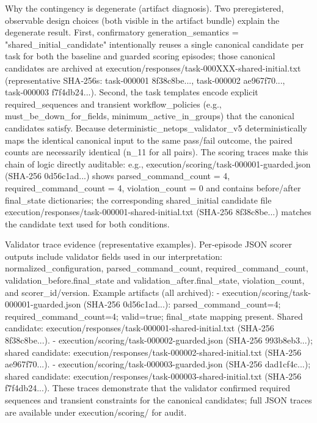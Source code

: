 \documentclass[conference]{IEEEtran}
\begin{document}
Why the contingency is degenerate (artifact diagnosis). Two preregistered, observable design choices (both visible in the artifact bundle) explain the degenerate result. First, confirmatory generation\_semantics = "shared\_initial\_candidate" intentionally reuses a single canonical candidate per task for both the baseline and guarded scoring episodes; those canonical candidates are archived at execution/responses/task-000XXX-shared-initial.txt (representative SHA‑256s: task‑000001 8f38c8be..., task‑000002 ae967f70..., task‑000003 f7f4db24...). Second, the task templates encode explicit required\_sequences and transient workflow\_policies (e.g., must\_be\_down\_for\_fields, minimum\_active\_in\_groups) that the canonical candidates satisfy. Because deterministic\_netops\_validator\_v5 deterministically maps the identical canonical input to the same pass/fail outcome, the paired counts are necessarily identical (n\_11 for all pairs). The scoring traces make this chain of logic directly auditable: e.g., execution/scoring/task-000001-guarded.json (SHA‑256 0d56c1ad...) shows parsed\_command\_count = 4, required\_command\_count = 4, violation\_count = 0 and contains before/after final\_state dictionaries; the corresponding shared\_initial candidate file execution/responses/task-000001-shared-initial.txt (SHA‑256 8f38c8be...) matches the candidate text used for both conditions.

Validator trace evidence (representative examples). Per‑episode JSON scorer outputs include validator fields used in our interpretation: normalized\_configuration, parsed\_command\_count, required\_command\_count, validation\_before.final\_state and validation\_after.final\_state, violation\_count, and scorer\_id/version. Example artifacts (all archived):
- execution/scoring/task-000001-guarded.json (SHA‑256 0d56c1ad...): parsed\_command\_count=4; required\_command\_count=4; valid=true; final\_state mapping present. Shared candidate: execution/responses/task-000001-shared-initial.txt (SHA‑256 8f38c8be...).
- execution/scoring/task-000002-guarded.json (SHA‑256 993b8eb3...); shared candidate: execution/responses/task-000002-shared-initial.txt (SHA‑256 ae967f70...).
- execution/scoring/task-000003-guarded.json (SHA‑256 dad1cf4c...); shared candidate: execution/responses/task-000003-shared-initial.txt (SHA‑256 f7f4db24...).
These traces demonstrate that the validator confirmed required sequences and transient constraints for the canonical candidates; full JSON traces are available under execution/scoring/ for audit.
\end{document}
